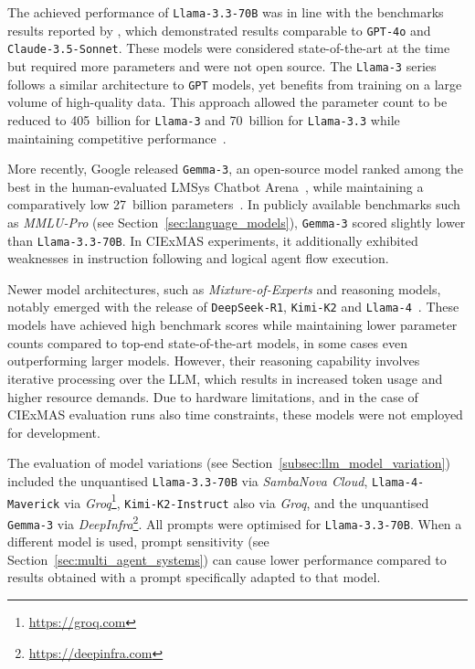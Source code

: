 \documentclass[a4paper,oneside,bibliography=totoc]{scrbook}
\begin{document}
The achieved performance of \texttt{Llama-3.3-70B} was in line with the benchmarks results reported by \citet{Meta2024}, which demonstrated results comparable to \texttt{GPT-4o} and \texttt{Claude-3.5-Sonnet}. These models were considered state-of-the-art at the time but required more parameters and were not open source. The \texttt{Llama-3} series follows a similar architecture to \texttt{GPT} models, yet benefits from training on a large volume of high-quality data. This approach allowed the parameter count to be reduced to 405~billion for \texttt{Llama-3} and 70~billion for \texttt{Llama-3.3} while maintaining competitive performance~\cite{Grattafiori2024,Meta2024}.

More recently, Google released \texttt{Gemma-3}, an open-source model ranked among the best in the human-evaluated LMSys Chatbot Arena~\cite{Chiang2024}, while maintaining a comparatively low 27~billion parameters~\cite{Team2025}. In publicly available benchmarks such as \textit{MMLU-Pro} (see Section~\ref{sec:language_models}), \texttt{Gemma-3} scored slightly lower than \texttt{Llama-3.3-70B}. In CIExMAS experiments, it additionally exhibited weaknesses in instruction following and logical agent flow execution.

Newer model architectures, such as \textit{Mixture-of-Experts} and reasoning models, notably emerged with the release of \texttt{DeepSeek-R1}, \texttt{Kimi-K2} and \texttt{Llama-4}~\cite{KimiTeam2025,DeepSeekAI2025,MetaAI2025}. These models have achieved high benchmark scores while maintaining lower parameter counts compared to top-end state-of-the-art models, in some cases even outperforming larger models. However, their reasoning capability involves iterative processing over the \ac{LLM}, which results in increased token usage and higher resource demands. Due to hardware limitations, and in the case of CIExMAS evaluation runs also time constraints, these models were not employed for development.

The evaluation of model variations (see Section~\ref{subsec:llm_model_variation}) included the unquantised \texttt{Llama-3.3-70B} via \textit{SambaNova Cloud}, \texttt{Llama-4-Maverick} via \textit{Groq}\footnote{\url{https://groq.com}}, \texttt{Kimi-K2-Instruct} also via \textit{Groq}, and the unquantised \texttt{Gemma-3} via \textit{DeepInfra}\footnote{\url{https://deepinfra.com}}. All prompts were optimised for \texttt{Llama-3.3-70B}. When a different model is used, prompt sensitivity (see Section~\ref{sec:multi_agent_systems}) can cause lower performance compared to results obtained with a prompt specifically adapted to that model.
\end{document}
